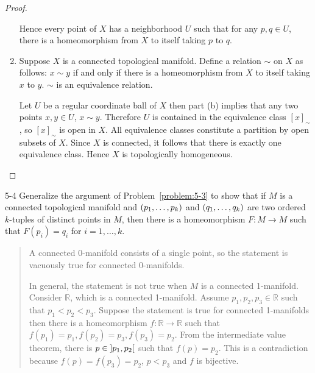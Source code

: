 \begin{proof}
\begin{enumerate}[label={(\alph*)}]
		      Hence every point of $X$ has a neighborhood $U$ such that for any $p, q \in U$, there is a homeomorphism from $X$ to itself taking $p$ to $q$.
		\item Suppose $X$ is a connected topological manifold. Define a relation $\sim$ on $X$ as follows: $x \sim y$ if and only if there is a homeomorphism from $X$ to itself taking $x$ to $y$. $\sim$ is an equivalence relation.

		      Let $U$ be a regular coordinate ball of $X$ then part (b) implies that any two points $x, y\in U$, $x \sim y$. Therefore $U$ is contained in the equivalence class ${[x]}_{\sim}$, so ${[x]}_{\sim}$ is open in $X$. All equivalence classes constitute a partition by open subsets of $X$. Since $X$ is connected, it follows that there is exactly one equivalence class. Hence $X$ is topologically homogeneous.
	\end{enumerate}
\end{proof}

\begin{problem}{5-4}\label{problem:5-4}
Generalize the argument of Problem~\ref{problem:5-3} to show that if $M$ is a connected topological manifold and $\left({p_{1}, \ldots, p_{k}}\right)$ and $\left({q_{1}, \ldots, q_{k}}\right)$ are two ordered $k$-tuples of distinct points in $M$, then there is a homeomorphism $F: M \to M$ such that $F(p_{i}) = q_{i}$ for $i = 1, \ldots, k$.
\end{problem}

\begin{quote}
	A connected 0-manifold consists of a single point, so the statement is vacuously true for connected 0-manifolds.

	In general, the statement is not true when $M$ is a connected 1-manifold. Consider $\mathbb{R}$, which is a connected 1-manifold. Assume $p_{1}, p_{2}, p_{3}\in \mathbb{R}$ such that $p_{1} < p_{2} < p_{3}$. Suppose the statement is true for connected 1-manifolds then there is a homeomorphism $f: \mathbb{R} \to \mathbb{R}$ such that $f(p_{1}) = p_{1}, f(p_{2}) = p_{3}, f(p_{3}) = p_{2}$. From the intermediate value theorem, there is $p \in \left]{p_{1}, p_{2}}\right[$ such that $f(p) = p_{2}$. This is a contradiction because $f(p) = f(p_{3}) = p_{2}$, $p < p_{3}$ and $f$ is bijective.
\end{quote}

